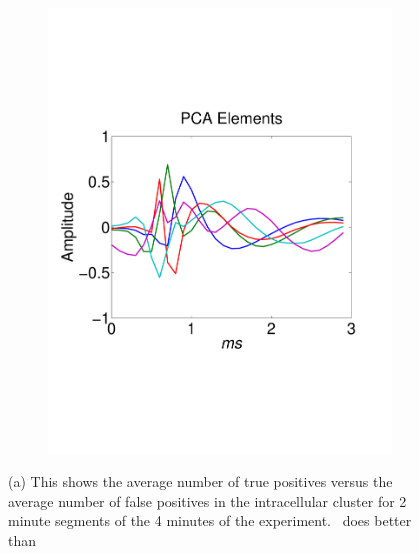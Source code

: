 
\begin{center}
\begin{figure}[h!]
\begin{subfigure}[b]{.3\textwidth}
\includegraphics[width=\textwidth]{../figs/new/pcaelements.pdf}
\caption{}
\label{fig:ICold}
\end{subfigure}
\begin{subfigure}[b]{.3\textwidth}
\caption{}
\label{fig:ICold}
\end{subfigure}
\begin{subfigure}[b]{.3\textwidth}
\caption{}
\label{fig:ICold}
\end{subfigure}
\caption{ 
} \label{fig:timing}
\end{figure}
\end{center}

\begin{figure}[htbp]
	\centering
	\caption{(a) This shows the average number of true positives versus the average number of false positives in the intracellular cluster for 2 minute segments of the 4 minutes of the experiment.  \smug\ does better than     }
	\label{fig:pairs}
\end{figure}


